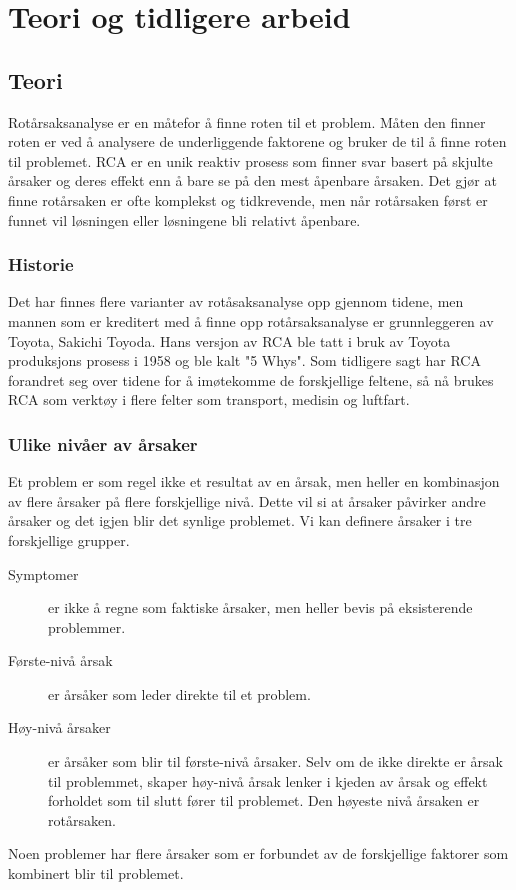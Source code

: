 \chapter{Teori og tidligere arbeid}
\label{kap:teori}

\section{Teori}
Rotårsaksanalyse er en måtefor å finne roten til et problem. Måten den finner roten er ved å analysere de underliggende faktorene og bruker de til å finne roten til problemet. RCA er en unik reaktiv prosess som finner svar basert på skjulte årsaker og deres effekt enn å bare se på den mest åpenbare årsaken. Det gjør at finne rotårsaken er ofte komplekst og tidkrevende, men når rotårsaken først er funnet vil løsningen eller løsningene bli relativt åpenbare.    
    \subsection{Historie}
    Det har finnes flere varianter av rotåsaksanalyse opp gjennom tidene, men mannen som er kreditert med å finne opp rotårsaksanalyse er grunnleggeren av Toyota, Sakichi Toyoda. Hans versjon av RCA ble tatt i bruk av Toyota produksjons prosess i 1958 og ble kalt "5 Whys". Som tidligere sagt har RCA forandret seg over tidene for å imøtekomme de forskjellige feltene, så nå brukes RCA som verktøy i flere felter som transport, medisin og luftfart. 
    
    \subsection{Ulike nivåer av årsaker}
    Et problem er som regel ikke et resultat av en årsak, men heller en kombinasjon av flere årsaker på flere forskjellige nivå. Dette vil si at årsaker påvirker andre årsaker og det igjen blir det synlige problemet. Vi kan definere årsaker i tre forskjellige grupper.
    \begin{description}
    \item[Symptomer] er ikke å regne som faktiske årsaker, men heller bevis på eksisterende problemmer.
    \item[Første-nivå årsak] er årsåker som leder direkte til et problem.
    \item[Høy-nivå årsaker] er årsåker som blir til første-nivå årsaker. Selv om de ikke direkte er årsak til problemmet, skaper høy-nivå årsak lenker i kjeden av årsak og effekt forholdet som til slutt fører til problemet.  Den høyeste nivå årsaken er rotårsaken.  
    \end{description}
Noen problemer har flere årsaker som er forbundet av de forskjellige faktorer som kombinert blir til problemet.

